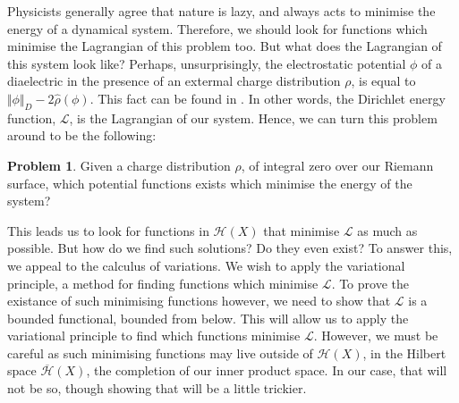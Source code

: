 \documentclass[11pt]{report}
\theoremstyle{definition}
\newtheorem*{problem}{Problem}
\begin{document}
Physicists generally agree that nature is lazy, and always acts to minimise the energy of a dynamical system. Therefore, we should look for functions which minimise the Lagrangian of this problem too. But what does the Lagrangian of this system look like? Perhaps, unsurprisingly, the electrostatic potential $\phi$ of a diaelectric in the presence of an extermal charge distribution $\rho$, is equal to $\Vert \phi \Vert_D - 2\hat{\rho}(\phi)$. This fact can be found in \cite{electromagentismBook}. In other words, the Dirichlet energy function, $\mathcal{L}$, is the Lagrangian of our system. Hence, we can turn this problem around to be the following:
\begin{problem}
  Given a charge distribution $\rho$, of integral zero over our Riemann surface, which potential functions exists which minimise the energy of the system?
\end{problem}
This leads us to look for functions in $\mathcal{H}(X)$ that minimise $\mathcal{L}$ as much as possible. But how do we find such solutions? Do they even exist? To answer this, we appeal to the calculus of variations. We wish to apply the variational principle, a method for finding functions which minimise $\mathcal{L}$. To prove the existance of such minimising functions however, we need to show that $\mathcal{L}$ is a bounded functional, bounded from below. This will allow us to apply the variational principle to find which functions minimise $\mathcal{L}$. However, we must be careful as such minimising functions may live outside of $\mathcal{H}(X)$, in the Hilbert space $\overline{\mathcal{H}}(X)$, the completion of our inner product space. In our case, that will not be so, though showing that will be a little trickier.
\end{document}
